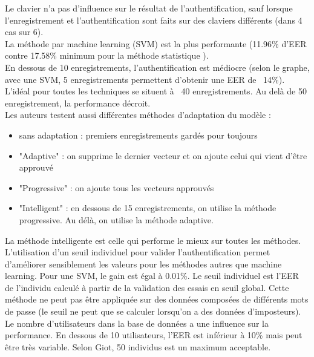 Le clavier n'a pas d'influence sur le résultat de l'authentification, sauf lorsque l'enregistrement et l'authentification sont faits sur des claviers différents (dans 4 cas sur 6).\\

La méthode par machine learning (SVM) est la plus performante (11.96\% d'EER contre 17.58\% minimum pour la méthode statistique ).\\

En dessous de 10 enregistrements, l'authentification est médiocre (selon le graphe, avec une SVM, 5 enregistrements permettent d'obtenir une EER de ~14\%). L'idéal pour toutes les techniques se situent à ~40 enregistrements. Au delà de 50 enregistrement, la performance décroit.\\

Les auteurs testent aussi différentes méthodes d'adaptation du modèle :\\

\begin{itemize}
  \item sans adaptation : premiers enregistrements gardés pour toujours
  \item "Adaptive" : on supprime le dernier vecteur et on ajoute celui qui vient d'être approuvé
  \item "Progressive" : on ajoute tous les vecteurs approuvés
  \item "Intelligent" : en dessous de 15 enregistrements, on utilise la méthode progressive. Au délà, on utilise la méthode adaptive.
\end{itemize}

La méthode intelligente est celle qui performe le mieux sur toutes les méthodes.\\

L'utilisation d'un seuil individuel pour valider l'authentification permet d'améliorer sensiblement les valeurs pour les méthodes autres que machine learning. Pour une SVM, le gain est égal à 0.01\%. Le seuil individuel est l'EER de l'individu calculé à partir de la validation des essais en seuil global. Cette méthode ne peut pas être appliquée sur des données composées de différents mots de passe (le seuil ne peut que se calculer lorsqu'on a des données d'imposteurs).\\

Le nombre d'utilisateurs dans la base de données a une influence sur la performance. En dessous de 10 utilisateurs, l'EER est inférieur à 10\% mais peut être très variable. Selon Giot, 50 individus est un maximum acceptable.
